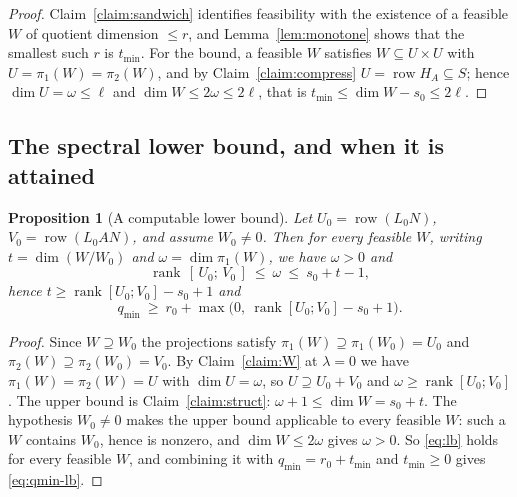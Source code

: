 ﻿\documentclass[journal]{IEEEtran}
\theoremstyle{plainn}
\newtheorem{prop}[thm]{Proposition}
\theoremstyle{remark}
\begin{document}
\begin{proof}
Claim~\ref{claim:sandwich} identifies feasibility with the existence of a feasible $W$ of
quotient dimension $\le r$, and Lemma~\ref{lem:monotone} shows that the smallest such $r$ is
$t_{\min}$. For the bound, a feasible $W$ satisfies $W\subseteq U\times U$ with $U=\pi_1(W)=\pi_2(W)$, and by
Claim~\ref{claim:compress} $U=\operatorname{row}H_A\subseteq S$; hence $\dim U=\omega\le\ell$ and
$\dim W\le2\omega\le2\ell$, that is $t_{\min}\le\dim W-s_0\le2\ell$.
\end{proof}

\subsection{The spectral lower bound, and when it is attained}\label{sec:lowerbound}

\begin{prop}[A computable lower bound]\label{prop:lowerbound}
Let $U_0=\operatorname{row}(L_0N)$, $V_0=\operatorname{row}(L_0AN)$, and assume $W_0\neq0$. Then for
every feasible $W$, writing $t=\dim(W/W_0)$ and $\omega=\dim\pi_1(W)$, we have $\omega>0$ and
\begin{equation}\label{eq:lb}
\operatorname{rank}\,[\,U_0;\,V_0\,]\ \le\ \omega\ \le\ s_0+t-1,
\end{equation}
hence $t\ge\operatorname{rank}[U_0;V_0]-s_0+1$ and
\begin{equation}\label{eq:qmin-lb}
q_{\min}\ \ge\ r_0+\max\bigl(0,\ \operatorname{rank}[U_0;V_0]-s_0+1\bigr).
\end{equation}
\end{prop}

\begin{proof}
Since $W\supseteq W_0$ the projections satisfy $\pi_1(W)\supseteq\pi_1(W_0)=U_0$ and
$\pi_2(W)\supseteq\pi_2(W_0)=V_0$. By Claim~\ref{claim:W} at $\lambda=0$ we have
$\pi_1(W)=\pi_2(W)=U$ with $\dim U=\omega$, so $U\supseteq U_0+V_0$ and
$\omega\ge\operatorname{rank}[U_0;V_0]$. The upper bound is Claim~\ref{claim:struct}:
$\omega+1\le\dim W=s_0+t$. The hypothesis $W_0\neq0$ makes the upper bound applicable to every
feasible $W$: such a $W$ contains $W_0$, hence is nonzero, and $\dim W\le2\omega$ gives $\omega>0$. So
\eqref{eq:lb} holds for every feasible $W$, and combining it with $q_{\min}=r_0+t_{\min}$ and
$t_{\min}\ge0$ gives \eqref{eq:qmin-lb}.
\end{proof}
\end{document}
